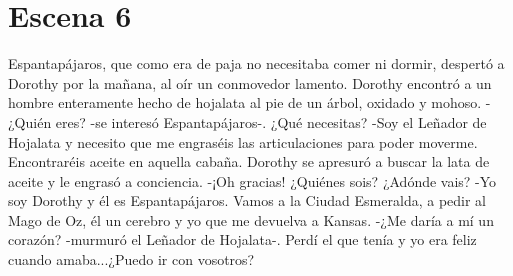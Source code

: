 \chapter{Escena 6}
Espantapájaros, que como era de paja no necesitaba comer ni dormir, despertó a Dorothy por la mañana, al oír un conmovedor lamento.
Dorothy encontró a un hombre enteramente hecho de hojalata al pie de un árbol, oxidado y mohoso.
-¿Quién eres? -se interesó Espantapájaros-. ¿Qué necesitas?
-Soy el Leñador de Hojalata y necesito que me engraséis las articulaciones para poder moverme. Encontraréis aceite en aquella cabaña.
Dorothy se apresuró a buscar la lata de aceite y le engrasó a conciencia.
-¡Oh gracias! ¿Quiénes sois? ¿Adónde vais?
-Yo soy Dorothy y él es Espantapájaros. Vamos a la Ciudad Esmeralda, a pedir al Mago de Oz, él un cerebro y yo que me devuelva a Kansas.
-¿Me daría a mí un corazón? -murmuró el Leñador de Hojalata-. Perdí el que tenía y yo era feliz cuando amaba...¿Puedo ir con vosotros?